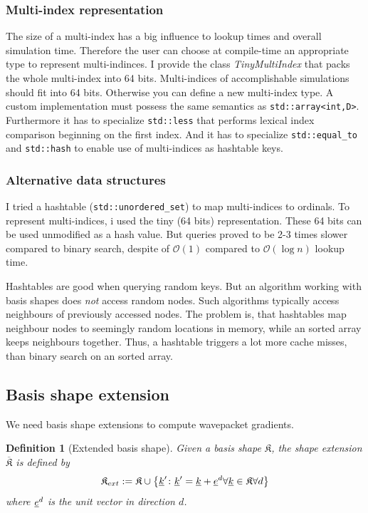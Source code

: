 \documentclass{article}
\def\code#1{\texttt{#1}}
\def\classname#1{\textit{#1}}
\newtheorem{definition}{Definition}
\begin{document}
\subsubsection{Multi-index representation}
The size of a multi-index has a big influence to lookup times and
overall simulation time. Therefore the user can choose at compile-time an appropriate
type to represent multi-indinces. I provide the class \classname{TinyMultiIndex}
that packs the whole multi-index into 64 bits.
Multi-indices of accomplishable simulations should fit into 64 bits.
Otherwise you can define a new multi-index type. A custom implementation
must possess the same semantics as \code{std::array<int,D>}.
Furthermore it has to specialize \code{std::less} that performs lexical index comparison
beginning on the first index.
And it has to specialize \code{std::equal\_to} and \code{std::hash} to
enable use of multi-indices as hashtable keys.

\subsubsection{Alternative data structures}
I tried a hashtable (\code{std::unordered\_set}) to map multi-indices to ordinals.
To represent multi-indices, i used the tiny (64 bits) representation.
These 64 bits can be used unmodified as a hash value.
But queries proved to be 2-3 times slower compared to binary search,
despite of \(\mathcal{O}(1)\) compared to \(\mathcal{O}(\log{}n)\) lookup time.
\par
Hashtables are good when querying random keys. But an algorithm working
with basis shapes does \emph{not} access random nodes.
Such algorithms typically access neighbours of previously accessed nodes.
The problem is, that hashtables
map neighbour nodes to seemingly random locations in memory,
while an sorted array keeps neighbours together. Thus, a hashtable triggers
a lot more cache misses, than binary search on an sorted array.

\subsection{Basis shape extension}

We need basis shape extensions to compute wavepacket gradients.

\begin{definition}[Extended basis shape]
  Given a basis shape \( \mathfrak{K} \),
  the shape extension \( \overline{\mathfrak{K}} \) is defined by
  \begin{equation}
    \mathfrak{K}_{ext} := \mathfrak{K} \cup 
    \left\{\underline{k}' \colon \underline{k}' = \underline{k} + \underline{e}^d 
      \forall \underline{k} \in \mathfrak{K} \forall d\right\}
  \end{equation}
  where \( \underline{e}^d \) is the unit vector in direction \( d \).
\end{definition}
\end{document}
